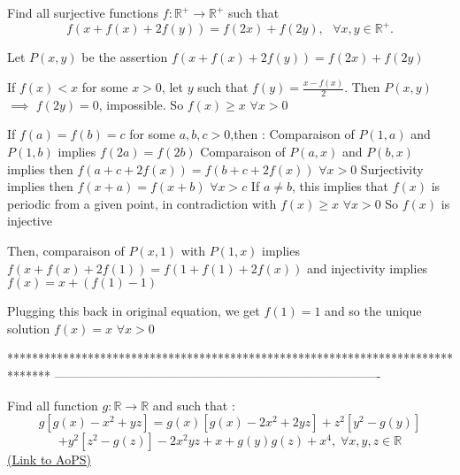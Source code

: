 \begin{solution}
	\begin{tcolorbox}Find all surjective functions $f:\mathbb{R}^+\to \mathbb{R}^+$ such that \[f(x+f(x)+2f(y))=f(2x)+f(2y), \ \ \ \forall x,y \in \mathbb{R}^+.\]\end{tcolorbox}
Let $P(x,y)$ be the assertion $f(x+f(x)+2f(y))=f(2x)+f(2y)$

If $f(x)<x$ for some $x>0$, let $y$ such that $f(y)=\frac{x-f(x)}2$. Then $P(x,y)$ $\implies$ $f(2y)=0$, impossible.
So $f(x)\ge x$ $\forall x>0$

If $f(a)=f(b)=c$ for some $a,b,c>0$,then :
Comparaison of $P(1,a)$ and $P(1,b)$ implies $f(2a)=f(2b)$
Comparaison of $P(a,x)$ and $P(b,x)$ implies then $f(a+c+2f(x))=f(b+c+2f(x))$ $\forall x>0$
Surjectivity implies then $f(x+a)=f(x+b)$ $\forall x>c$
If $a\ne b$, this implies that $f(x)$ is periodic from a given point, in contradiction with $f(x)\ge x$ $\forall x>0$
So $f(x)$ is injective

Then, comparaison of $P(x,1)$ with $P(1,x)$ implies $f(x+f(x)+2f(1))=f(1+f(1)+2f(x))$ and injectivity implies $f(x)=x+(f(1)-1)$

Plugging this back in original equation, we get $f(1)=1$ and so the unique solution $\boxed{f(x)=x}$ $\forall x>0$
\end{solution}
*******************************************************************************
-------------------------------------------------------------------------------

\begin{problem}
	Find all function $g:\mathbb{R}\rightarrow \mathbb{R}$ and such that :
\[g\left [ g(x)-x^2+yz \right ]=g(x)\left [ g(x)-2x^2+2yz \right ]+z^2\left [ y^2-g(y) \right ]\]
\[+y^2\left [ z^2-g(z) \right ]-2x^2yz+x+g(y)g(z)+x^4,\;\forall x,y,z\in \mathbb{R}\]
	\flushright \href{https://artofproblemsolving.com/community/c6h613709}{(Link to AoPS)}
\end{problem}



